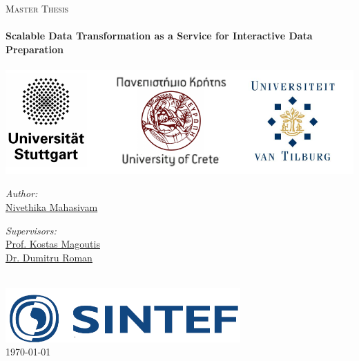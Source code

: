 \documentclass[11pt, a4paper, oneside]{Thesis} %
\begin{document}
\begin{titlepage}
\begin{center}

\textsc{\Large Master Thesis}\\[0.5cm] %

\HRule \\[0.5cm] %
{\huge \bfseries Scalable Data Transformation as a Service for Interactive Data Preparation }\\[0.5cm] %
\HRule \\[1.8cm] %

\includegraphics[width=15cm]{Figures/Uni}\\[1.5cm] %
 
\begin{minipage}[t]{0.4\textwidth}
\begin{flushleft} \large
\emph{Author:}\\
\href{https://no.linkedin.com/in/nivemaham}{Nivethika Mahasivam} %
\end{flushleft}
\end{minipage}
\begin{minipage}[t]{0.4\textwidth}
\begin{flushright} \large
\emph{Supervisors:} \\
\href{http://users.ics.forth.gr/~magoutis/}{Prof. Kostas Magoutis} \\ %
\href{http://www.mn.uio.no/ifi/english/people/aca/dumitrur/}{Dr. Dumitru Roman} 
\end{flushright}
\end{minipage}\\[5cm]
 
\includegraphics[width=9cm]{Figures/Sintef}\\[1cm]
 
{\large \today}\\[4cm] %

 
\vfill
\end{center} 

\end{titlepage}
\end{document}
